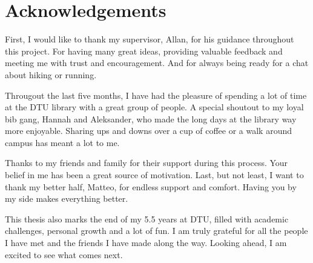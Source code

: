 \chapter*{Acknowledgements}
First, I would like to thank my supervisor, Allan, for his guidance throughout this project.
For having many great ideas, providing valuable feedback and meeting me with trust and encouragement.
And for always being ready for a chat about hiking or running.

Througout the last five months, I have had the pleasure of spending a lot of time at the DTU library with a great group of people.
A special shoutout to my loyal bib gang, Hannah and Aleksander, who made the long days at the library way more enjoyable.
Sharing ups and downs over a cup of coffee or a walk around campus has meant a lot to me.

Thanks to my friends and family for their support during this process.
Your belief in me has been a great source of motivation.
Last, but not least, I want to thank my better half, Matteo, for endless support and comfort.
Having you by my side makes everything better.

This thesis also marks the end of my 5.5 years at DTU, filled with academic challenges, personal growth and a lot of fun.
I am truly grateful for all the people I have met and the friends I have made along the way.
Looking ahead, I am excited to see what comes next.
